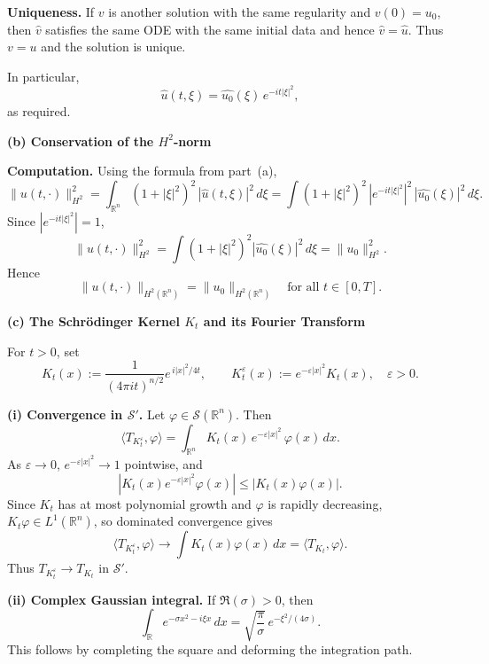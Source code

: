 \begin{problem}[CP-III-0019]
\par\smallskip\noindent\textbf{\textbf{Uniqueness.}}\quad
If $v$ is another solution with the same regularity and $v(0)=u_0$, then
$\widehat{v}$ satisfies the same ODE with the same initial data and
hence $\widehat{v}=\widehat{u}$. Thus $v=u$ and the solution is unique.

\medskip
In particular,
\[
\widehat{u}(t,\xi) = \widehat{u_0}(\xi)\,e^{-it|\xi|^2},
\]
as required.

\par\smallskip\noindent\textbf{(b) \; Conservation of the $H^2$-norm}\quad

\par\smallskip\noindent\textbf{\textbf{Computation.}}\quad
Using the formula from part~(a),
\[
\|u(t,\cdot)\|_{H^2}^2
= \int_{\mathbb{R}^n} (1+|\xi|^2)^2\,|\widehat{u}(t,\xi)|^2\,d\xi
= \int (1+|\xi|^2)^2\,|e^{-it|\xi|^2}|^2\,|\widehat{u_0}(\xi)|^2\,d\xi.
\]
Since $|e^{-it|\xi|^2}|=1$,
\[
\|u(t,\cdot)\|_{H^2}^2
= \int (1+|\xi|^2)^2 |\widehat{u_0}(\xi)|^2\,d\xi
= \|u_0\|_{H^2}^2.
\]
Hence
\[
\|u(t,\cdot)\|_{H^2(\mathbb{R}^n)} = \|u_0\|_{H^2(\mathbb{R}^n)}
\quad \text{for all } t\in[0,T].
\]

\par\smallskip\noindent\textbf{(c) \; The Schrödinger Kernel $K_t$ and its Fourier Transform}\quad

For $t>0$, set
\[
K_t(x) := \frac{1}{(4\pi i t)^{n/2}} e^{\, i|x|^2 /4t},
\qquad
K_t^\varepsilon(x) := e^{-\varepsilon|x|^2}K_t(x),\quad \varepsilon>0.
\]

\par\smallskip\noindent\textbf{\textbf{(i) Convergence in $\mathscr{S}'$.}}\quad
Let $\varphi\in\mathscr{S}(\mathbb{R}^n)$. Then
\[
\langle T_{K_t^\varepsilon},\varphi\rangle
= \int_{\mathbb{R}^n} K_t(x)\,e^{-\varepsilon|x|^2}\,\varphi(x)\,dx.
\]
As $\varepsilon\to0$, $e^{-\varepsilon|x|^2}\to1$ pointwise, and
\[
|K_t(x)e^{-\varepsilon|x|^2}\varphi(x)|
\le |K_t(x)\varphi(x)|.
\]
Since $K_t$ has at most polynomial growth and $\varphi$ is rapidly
decreasing, $K_t\varphi\in L^1(\mathbb{R}^n)$, so dominated convergence
gives
\[
\langle T_{K_t^\varepsilon},\varphi\rangle
\longrightarrow \int K_t(x)\varphi(x)\,dx
= \langle T_{K_t},\varphi\rangle.
\]
Thus $T_{K_t^\varepsilon}\to T_{K_t}$ in $\mathscr{S}'$.

\par\smallskip\noindent\textbf{\textbf{(ii) Complex Gaussian integral.}}\quad
If $\Re(\sigma)>0$, then
\[
\int_{\mathbb{R}} e^{-\sigma x^2 - i\xi x}\,dx
= \sqrt{\frac{\pi}{\sigma}}\, e^{-\xi^2/(4\sigma)}.
\]
This follows by completing the square and deforming the integration path.


\end{problem}
